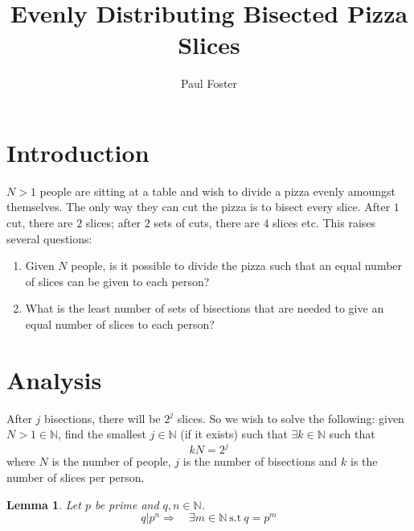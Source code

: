 \documentclass{article}
\title{Evenly Distributing Bisected Pizza Slices}
\author{Paul Foster}
\begin{document}
\maketitle

\newtheorem{theorem}{Theorem}
\newtheorem{corollary}{Corollary}[theorem]
\newtheorem{lemma}[theorem]{Lemma}

\section{Introduction}
$N>1$ people are sitting at a table and wish to divide a pizza evenly amoungst themselves. The only way they can cut the pizza is to bisect every slice. After $1$ cut, there are $2$ slices; after $2$ sets of cuts, there are $4$ slices etc. This raises several questions:
\begin{enumerate}
  \item Given $N$ people, is it possible to divide the pizza such that an equal number of slices can be given to each person?
  \item What is the least number of sets of bisections that are needed to give an equal number of slices to each person?
\end{enumerate}

\section{Analysis}
After $j$ bisections, there will be $2^j$ slices. So we wish to solve the following: given $N>1 \in \mathbb{N}$, find the smallest $j \in \mathbb{N}$ (if it exists) such that $\exists k \in \mathbb{N}$ such that
\begin{equation} \label{eq:1}
  kN = 2^j
\end{equation}
where $N$ is the number of people, $j$ is the number of bisections and $k$ is the number of slices per person.

\begin{lemma} \label{lem:1}
Let $p$ be prime and $q,n \in \mathbb{N}$.
\begin{equation}
  q | p^n \Rightarrow\quad \exists m \in \mathbb{N}~\text{s.t}~q = p^m
\end{equation}
\end{lemma}
\end{document}
